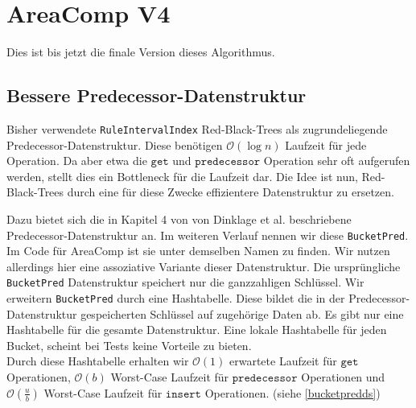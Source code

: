 



\section{AreaComp V4}
\label{v4}

Dies ist bis jetzt die finale Version dieses Algorithmus. 

\subsection{Bessere Predecessor-Datenstruktur}

Bisher verwendete \texttt{RuleIntervalIndex} Red-Black-Trees als zugrundeliegende Predecessor-Datenstruktur. Diese benötigen $\mathcal{O}(\log n)$ Laufzeit für jede Operation. Da aber etwa die $\texttt{get}$ und $\texttt{predecessor}$ Operation sehr oft aufgerufen werden, stellt dies ein Bottleneck für die Laufzeit dar.
Die Idee ist nun, Red-Black-Trees durch eine für diese Zwecke effizientere Datenstruktur zu ersetzen.

Dazu bietet sich die in Kapitel 4 von \cite{dinklage_engineering_2021} von Dinklage et al. beschriebene Predecessor-Datenstruktur an. Im weiteren Verlauf nennen wir diese \texttt{BucketPred}. Im Code für AreaComp ist sie unter demselben Namen zu finden. Wir nutzen allerdings hier eine assoziative Variante dieser Datenstruktur. Die ursprüngliche \texttt{BucketPred} Datenstruktur speichert nur die ganzzahligen Schlüssel. Wir erweitern \texttt{BucketPred} durch eine Hashtabelle. Diese bildet die in der Predecessor-Datenstruktur gespeicherten Schlüssel auf zugehörige Daten ab. Es gibt nur eine Hashtabelle für die gesamte Datenstruktur.   
Eine lokale Hashtabelle für jeden Bucket, scheint bei Tests keine Vorteile zu bieten.\\
Durch diese Hashtabelle erhalten wir $\mathcal{O}(1)$ erwartete Laufzeit für $\texttt{get}$ Operationen, $\mathcal{O}(b)$ Worst-Case Laufzeit für $\texttt{predecessor}$ Operationen und $\mathcal{O}(\tfrac{u}{b})$ Worst-Case Laufzeit für $\texttt{insert}$ Operationen. (siehe \autoref{bucketpredds}) 

